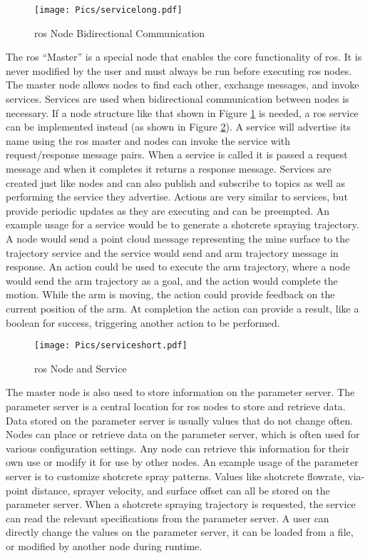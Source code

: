 \begin{figure}[h!]
    \centering
    \texttt{[image: Pics/servicelong.pdf]}
    \caption{\acrshort{ros} Node Bidirectional Communication}
    \label{fig:rosservicelong}
\end{figure}

The \acrshort{ros} ``Master'' is a special node that enables the core functionality of \acrshort{ros}. It is never modified by the user and must always be run before executing \acrshort{ros} nodes. The master node allows nodes to find each other, exchange messages, and invoke services. Services are used when bidirectional communication between nodes is necessary. If a node structure like that shown in Figure \ref{fig:rosservicelong} is needed, a \acrshort{ros} service can be implemented instead (as shown in Figure \ref{fig:rosservice}). A service will advertise its name using the \acrshort{ros} master and nodes can invoke the service with request/response message pairs. When a service is called it is passed a request message and when it completes it returns a response message. Services are created just like nodes and can also publish and subscribe to topics as well as performing the service they advertise. Actions are very similar to services, but provide periodic updates as they are executing and can be preempted. An example usage for a service would be to generate a shotcrete spraying trajectory. A node would send a point cloud message representing the mine surface to the trajectory service and the service would send and arm trajectory message in response. An action could be used to execute the arm trajectory, where a node would send the arm trajectory as a goal, and the action would complete the motion. While the arm is moving, the action could provide feedback on the current position of the arm. At completion the action can provide a result, like a boolean for success, triggering another action to be performed.\\

\begin{figure}[h!]
    \centering
    \texttt{[image: Pics/serviceshort.pdf]}
    \caption{\acrshort{ros} Node and Service}
    \label{fig:rosservice}
\end{figure}

The master node is also used to store information on the parameter server. The parameter server is a central location for \acrshort{ros} nodes to store and retrieve data. Data stored on the parameter server is usually values that do not change often. Nodes can place or retrieve data on the parameter server, which is often used for various configuration settings. Any node can retrieve this information for their own use or modify it for use by other nodes. An example usage of the parameter server is to customize shotcrete spray patterns. Values like shotcrete flowrate, via-point distance, sprayer velocity, and surface offset can all be stored on the parameter server. When a shotcrete spraying trajectory is requested, the service can read the relevant specifications from the parameter server. A user can directly change the values on the parameter server, it can be loaded from a file, or modified by another node during runtime.\\

